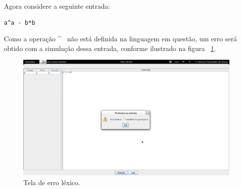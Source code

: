 Agora considere a seguinte entrada:
\begin{verbatim}
a^a - b*b
\end{verbatim}

Como a operação \^~ não está definida na linguagem em questão, um erro será obtido com a simulação dessa entrada, conforme ilustrado na figura ~\ref{sintelo-lexico-erro}. 

\begin{figure}[ht!]
	\centering
	\includegraphics[scale=0.28]{imgs/sintelo-lexico-erro}
	\caption{Tela de erro léxico.}
	\label{sintelo-lexico-erro}
\end{figure}

